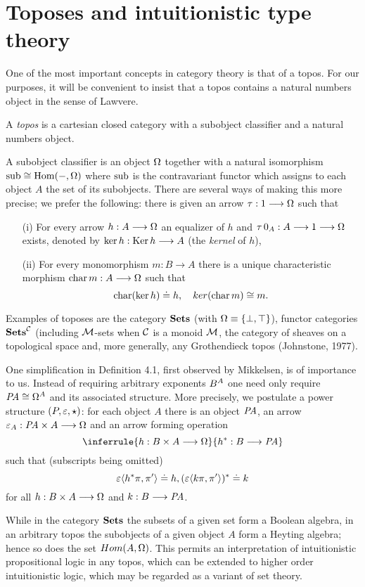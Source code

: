 \section{Toposes and intuitionistic type theory}

One of the most important concepts in category theory is that of a topos.
For our purposes, it will be convenient to insist that a topos contains a
natural numbers object in the sense of Lawvere.

\begin{defn}
A {\em topos} is a cartesian closed category with a subobject
classifier and a natural numbers object.

A subobject classifier is an object $\Omega$ together with a natural
isomorphism $\mathop{\rm sub} \cong \operatorname{{Hom}}(-, \Omega)$ where $\mathop{\rm sub}$ is the 
contravariant functor which
assigns to each object $A$ the set of its subobjects. There are several ways
of making this more precise; we prefer the following: there is given an arrow
$\tau: 1 \longrightarrow \Omega$ such that
\begin{enumerate}
\item[(i)] For every arrow $h: A \longrightarrow \Omega$ an equalizer of $h$ and $\tau\, 0_A: A \longrightarrow 1 \longrightarrow \Omega$
exists, denoted by $\mathop{\rm ker} h: \mathop{\rm Ker} h \longrightarrow A$ (the {\em kernel} of $h$),
\item[(ii)] For every monomorphism $m: B \to A$ there is a unique characteristic
morphism $\mathop{\rm char} m: A \longrightarrow \Omega$ such that
\[
\mathop{\rm char}(\mathop{\rm ker} h) \doteq h, \quad ker(\mathop{\rm char} m) \cong m.
\]
\end{enumerate}
\end{defn}
Examples of toposes are the category ${\mathbf {Sets}}$ (with $\Omega \equiv \{\bot, \top\}$),
functor categories ${\mathbf {Sets}}^{\mathcal C}$ (including ${\mathcal M}$-sets when $\mathcal C$ is 
a monoid ${\mathcal M}$, the category of sheaves on a topological space and, 
more generally, any Grothendieck topos (Johnstone, 1977).

One simplification in Definition 4.1, first observed by Mikkelsen, is of
importance to us. Instead of requiring arbitrary exponents $B^{A}$  one need only
require $\mathit{PA} \cong \Omega^{A}$ and its associated structure.
More precisely, we postulate a power ~ structure $(P,\varepsilon,\star)$: 
for each object $A$ there is an object $\mathit{PA}$, an arrow $\varepsilon_A : \mathit{PA} \times A\longrightarrow \Omega$
and an arrow forming operation
\[
\inferrule{h: B \times A \to \OM}{h^*: B \to \PA}
\]
such that (subscripts being omitted)
\[
\varepsilon\langle h^* \pi,\pi'\rangle \doteq h, (\varepsilon\langle k \pi,\pi'\rangle)^* \doteq k 
\]
for all $h: B\times A \longrightarrow \Omega$ and $k: B \longrightarrow \mathit{PA}$.

While in the category ${\mathbf {Sets}}$ the subsets of a given set form a Boolean
algebra, in an arbitrary topos the subobjects of a given object $A$ form a
Heyting algebra; hence so does the set $Hom(A,\Omega)$. This permits an 
interpretation of intuitionistic propositional logic in any topos, which can be
extended to higher order intuitionistic logic, which may be regarded as a
variant of set theory.

